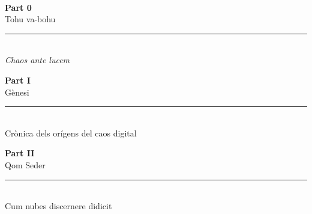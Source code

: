 \documentclass[12pt, a5paper, twoside]{book}
\let\cleardoublepage\clearpage %
\begin{document}

\begin{titlepage}
\thispagestyle{empty}
\vfill
~
\end{titlepage}
\cleardoublepage



\cleardoublepage
    \thispagestyle{empty}
        \vspace*{\fill}
            \begin{center}
                {\normalfont\huge\bfseries Part 0}\\[0.5cm]
                {\Huge Tohu va-bohu}\\[1ex]
                \rule[0.5ex]{5cm}{0.5pt}\\[1ex]
                {\emph{Chaos ante lucem}}
            \end{center}
        \vspace*{\fill}
\cleardoublepage



\cleardoublepage
    \thispagestyle{empty}
        \vspace*{\fill}
            \begin{center}
                {\normalfont\huge\bfseries Part I}\\[0.5cm]
                {\Huge Gènesi}\\[1ex]
                \rule[0.5ex]{5cm}{0.5pt}\\[1ex]
                {Crònica dels orígens del caos digital}
            \end{center}
        \vspace*{\fill}
\cleardoublepage



\cleardoublepage
\thispagestyle{empty}
\vspace*{\fill}
\begin{center}
    {\normalfont\huge\bfseries Part II}\\[0.5cm]
    {\Huge Qom Seder}\\[1ex]
    \rule[0.5ex]{5cm}{0.5pt}\\[1ex]
    {\small Cum nubes discernere didicit}
\end{center}
\vspace*{\fill}
\cleardoublepage
\end{document}

